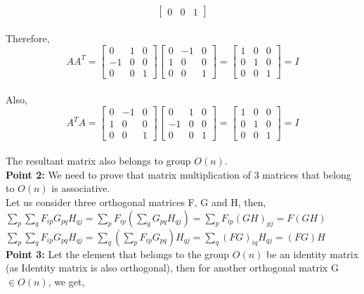 \documentclass[10pt]{article}
\begin{document}
\begin{flushleft}
$$\begin{bmatrix}
0 & 0 & 1 
\end{bmatrix}
$$
\\
Therefore, 
$$
A A^{T} =
\begin{bmatrix} 
0 & 1 & 0 \\
-1 & 0 & 0 \\
0 & 0 & 1 
\end{bmatrix}
\begin{bmatrix} 
0 & -1 & 0 \\
1 & 0 & 0 \\
0 & 0 & 1 
\end{bmatrix}
= 
\begin{bmatrix} 
1 & 0 & 0 \\
0 & 1 & 0 \\
0 & 0 & 1 
\end{bmatrix}
 = I
$$
\\
Also,
$$
A^{T} A=
\begin{bmatrix} 
0 & -1 & 0 \\
1 & 0 & 0 \\
0 & 0 & 1 
\end{bmatrix}
\begin{bmatrix} 
0 & 1 & 0 \\
-1 & 0 & 0 \\
0 & 0 & 1 
\end{bmatrix}
= 
\begin{bmatrix} 
1 & 0 & 0 \\
0 & 1 & 0 \\
0 & 0 & 1 
\end{bmatrix}
 = I
$$
\\
The resultant matrix also belongs to group $O(n)$.\\
\vspace{0.5em}
\textbf{Point 2:}  We need to prove that matrix multiplication of 3 matrices that belong to $O(n)$ is associative.\\
Let us consider three orthogonal matrices F, G and H, then,\\
\vspace{0.5em}
$\sum_{p} \sum_{q} F_{ip} G_{pq} H_{qj} = \sum_{p} F_{ip} (\sum_{q} G_{pq} H_{qj}) = \sum_{p} F_{ip} (GH)_{pj} = F(GH)$\\
\vspace{0.5em}
$\sum_{p} \sum_{q} F_{ip} G_{pq} H_{qj} = \sum_{q} (\sum_{p} F_{ip} G_{pq}) H_{qj} = \sum_{q} (FG)_{iq} H_{qj} = (FG)H$\\
\vspace{0.5em}
\textbf{Point 3:} 
Let the element that belongs to the group $O(n)$ be an identity matrix (as Identity matrix is also orthogonal), then for another orthogonal matrix G $\in O(n)$, we get,\\

\end{flushleft}
\end{document}
